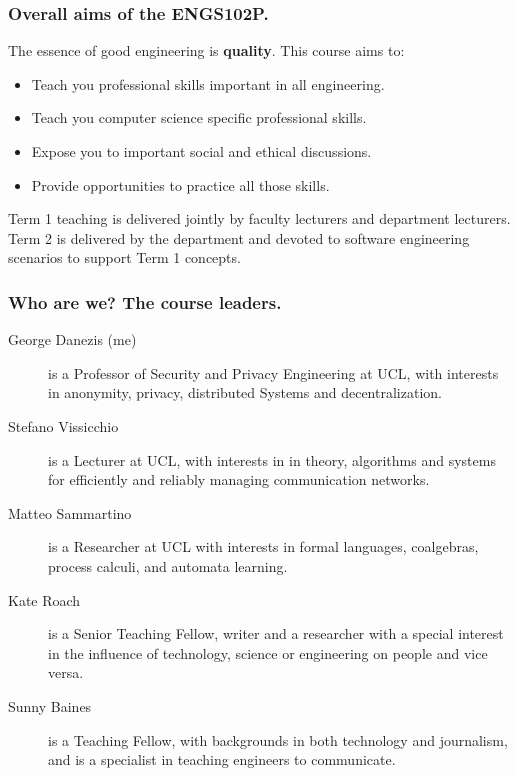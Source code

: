 \documentclass{beamer} %
\newcommand\emc[1]{\textcolor{brightblue}{\textbf{#1}}}
\begin{document}
\begin{frame}
\frametitle{Overall aims of the ENGS102P.} 

The essence of good engineering is \emc{quality}. This course aims to:

\begin{itemize}
	\item Teach you professional skills important in all engineering.
	\item Teach you computer science specific professional skills.
	\item Expose you to important social and ethical discussions.
	\item Provide opportunities to practice all those skills.
\end{itemize}

\vspace{3mm}
Term 1 teaching is delivered jointly by faculty lecturers and department lecturers. Term 2 is delivered by the department and devoted to software engineering scenarios to support Term 1 concepts.

\end{frame}

\begin{frame}
\frametitle{Who are we? The course leaders.} 

\begin{description}
\item[George Danezis (me)] is a Professor of Security and Privacy Engineering at UCL, with interests in anonymity, privacy, distributed Systems and decentralization.
\item[Stefano Vissicchio] is a Lecturer at UCL, with interests in in theory, algorithms and systems for efficiently and reliably managing communication networks.
\item[Matteo Sammartino] is a Researcher at UCL with interests in formal languages, coalgebras, process calculi, and automata learning.
\item[Kate Roach] is a Senior Teaching Fellow, writer and a researcher with a special interest in the influence of technology, science or engineering on people and vice versa.
\item[Sunny Baines] is a Teaching Fellow, with backgrounds in both technology and journalism, and is a specialist in teaching engineers to communicate.
\end{description}

\end{frame}
\end{document}
